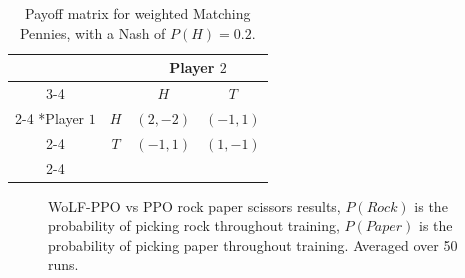 \documentclass[conference]{IEEEtran}
\begin{document}
\begin{table}[!ht]
    \centering
    \setlength{\extrarowheight}{2pt}
    \begin{tabular}{*{4}{c|}}
      \multicolumn{2}{c}{} & \multicolumn{2}{c}{Player $2$}\\\cline{3-4}
      \multicolumn{1}{c}{} &  & $H$  & $T$ \\\cline{2-4}
      \multirow{2}*{Player $1$}  & $H$ & $(2,-2)$ & $(-1,1)$ \\\cline{2-4}
      & $T$ & $(-1,1)$ & $(1,-1)$ \\\cline{2-4}
    \end{tabular}
    \caption{Payoff matrix for weighted Matching Pennies, with a Nash of $P(H)=0.2$.}
    \label{tab:weighted-mp}
\end{table}

\begin{figure}[htbp]
    \caption{WoLF-PPO vs PPO rock paper scissors results, $P(Rock)$ is the probability of picking rock throughout training, $P(Paper)$ is the probability of picking paper throughout training. Averaged over 50 runs.}
\end{figure}
\end{document}
